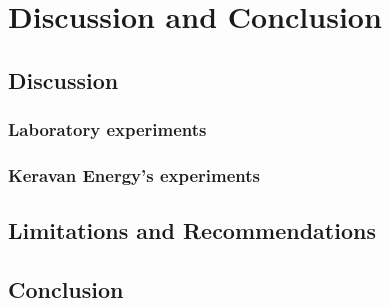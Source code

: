 
\chapter{Discussion and Conclusion}

\section{Discussion}
\subsection{Laboratory experiments}
\subsection{Keravan Energy's experiments}
\section{Limitations and Recommendations}
\section{Conclusion}

\clearpage %

